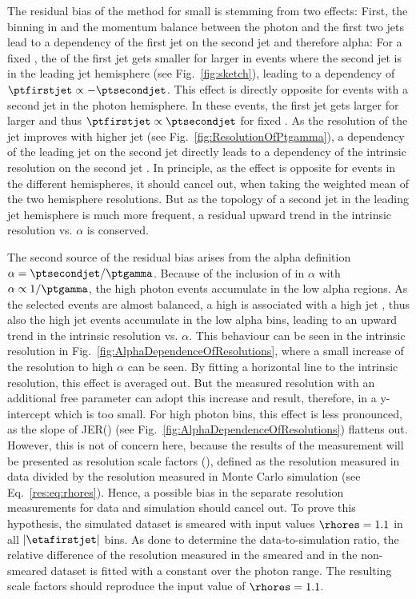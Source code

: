 The residual bias of the method for small \ptgamma is stemming from two effects: 
First, the binning in \ptgamma and the momentum balance between the photon and the first two jets lead to a dependency of the first jet \pt on the second jet \pt and therefore alpha: 
For a fixed \ptgamma, the \pt of the first jet gets smaller for larger \ptsecondjet in events where the second jet is in the leading jet hemisphere (see Fig.~\ref{fig:sketch}), 
leading to a dependency of $\ptfirstjet \propto -\ptsecondjet$.
This effect is directly opposite for events with a second jet in the photon hemisphere. 
In these events, the first jet \pt gets larger for larger \ptsecondjet and thus $\ptfirstjet \propto \ptsecondjet$ for fixed \ptgamma. 
As the resolution of the jet improves with higher jet \pt (see Fig.~\ref{fig:ResolutionOfPtgamma}), a dependency of the leading jet \pt on the second jet \pt directly leads to a dependency of the intrinsic resolution on the second jet \pt. 
In principle, as the effect is opposite for events in the different hemispheres, it should cancel out, when taking the weighted mean of the two hemisphere resolutions. 
But as the topology of a second jet in the leading jet hemisphere is much more frequent, a residual upward trend in the intrinsic resolution vs. $\alpha$ is conserved. 

The second source of the residual bias arises from the alpha definition $\alpha = \ptsecondjet/\ptgamma$. 
Because of the inclusion of \ptgamma in $\alpha$ with $\alpha \propto 1/\ptgamma$, 
the high photon \pt events accumulate in the low alpha regions. 
As the selected events are almost balanced, a high \ptgamma is associated with a high jet \pt, thus also the high jet \pt events accumulate in the low alpha bins, leading to  an upward trend in the intrinsic resolution vs. $\alpha$. 
This behaviour can be seen in the intrinsic resolution in Fig.~\ref{fig:AlphaDependenceOfResolutions}, where a small increase of the resolution to high $\alpha$ can be seen. 
By fitting a horizontal line to the intrinsic resolution, this effect is averaged out. 
But the measured resolution with an additional free parameter can adopt this increase and result, therefore, in a y-intercept which is too small. 
For high photon \pt bins, this effect is less pronounced, as the slope of JER(\ptgamma) (see Fig.~\ref{fig:AlphaDependenceOfResolutions}) flattens out.\\

However, this is not of concern here, because the results of the measurement will be presented as resolution scale factors (\rhores), defined as the resolution measured in data divided by the resolution measured in Monte Carlo simulation (see Eq.~\eqref{res:eq:rhores}). 
Hence, a possible bias in the separate resolution measurements for data and simulation should cancel out. 
To prove this hypothesis, the simulated dataset is smeared with input values $\rhores =1.1$ in all $|\etafirstjet|$ bins. 
As done to determine the data-to-simulation ratio, the relative difference of the resolution measured in the smeared and in the non-smeared dataset is fitted with a constant over the photon \pt range.
The resulting scale factors \rhores should reproduce the input value of $\rhores=1.1$.


